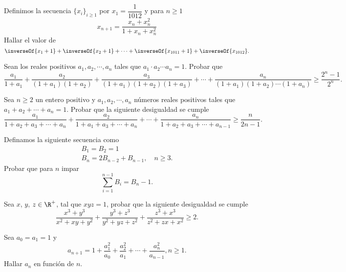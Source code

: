 \begin{section-problem}
    Definimos la secuencia $\{x_i\}_{i \geq 1}$ por $x_1 = \dfrac{1}{1012}$ y para $n \geq 1$
    \[x_{n + 1} = \frac{x_n + x_n^2}{1 + x_n + x_n^2}\]
    Hallar el valor de
    \[\inverseOf{x_1 + 1} + \inverseOf{x_2 + 1} + \cdots + \inverseOf{x_{1011} + 1} + \inverseOf{x_{1012}}.\]
\end{section-problem}

\begin{section-problem}
    Sean los reales positivos $a_1, a_2, \cdots, a_n$ tales que $a_1 \cdot a_2 \cdots a_n = 1$.
    Probar que
    \[\frac{a_1}{1 + a_1} + \frac{a_2}{(1 + a_1)(1 + a_2)} + \frac{a_3}{(1 + a_1)(1 + a_2)(1 + a_3)} + \cdots + \frac{a_n}{(1 + a_1)(1 + a_2)\cdots(1 + a_n)} \geq \frac{2^n - 1}{2^n}.\]
\end{section-problem}

\begin{section-problem}
    Sea $n\geq 2$ un entero positivo y $a_1, a_2, \cdots, a_n$ números reales positivos tales que $a_1 + a_2 + \cdots + a_n = 1$.
    Probar que la siguiente desigualdad se cumple
    \[\frac{a_1}{1 + a_2 + a_3 + \cdots + a_n} + \frac{a_2}{1 + a_1 + a_3 + \cdots + a_n} + \cdots + \frac{a_n}{1 + a_2 + a_3 + \cdots + a_{n - 1}} \geq \frac{n}{2n - 1}.\]
\end{section-problem}

\begin{section-problem}
    Definamos la siguiente secuencia como
    \begin{gather*}
        B_1 = B_2 = 1\\
        B_n = 2 B_{n - 2} + B_{n - 1}, \quad n \geq 3.
    \end{gather*}
    Probar que para $n$ impar
    \[\sum_{i = 1}^{n - 1} B_i = B_n - 1.\]
\end{section-problem}

\begin{section-problem}
    Sea $x$, $y$, $z \in \R^+$, tal que $xyz = 1$, probar que la siguiente desigualdad se cumple
    \[\frac{x^3 + y^3}{x^2 + xy + y^2} + \frac{y^3 + z^3}{y^2 + yz + z^2} + \frac{z^3 + x^3}{z^2 + zx + x^2} \geq 2.\]
\end{section-problem}

\begin{section-problem}
    Sea $a_0 = a_1 = 1$ y
    \[a_{n + 1} = 1 + \frac{a^2_1}{a_0} + \frac{a^2_2}{a_1} + \cdots + \frac{a^2_n}{a_{n - 1}}, n \geq 1.\]
    Hallar $a_n$ en función de $n$.
\end{section-problem}

